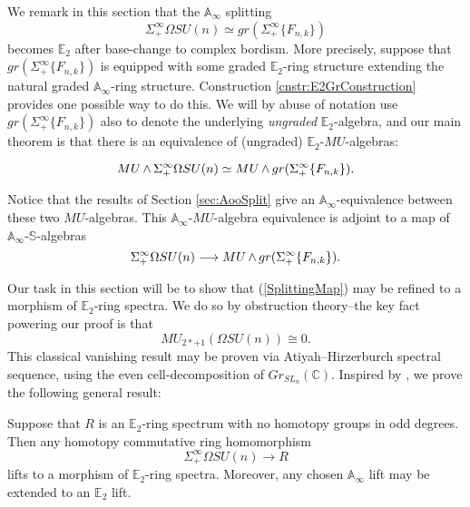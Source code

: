 
We remark in this section that the $\mathbb{A}_\infty$ splitting $$\Sigma^{\infty}_+ \Omega SU(n) \simeq gr(\Sigma^{\infty}_+ \{F_{n,k}\})$$ becomes $\mathbb{E}_2$ after base-change to complex bordism.  More precisely, suppose that $gr(\Sigma^{\infty}_+ \{F_{n,k}\})$ is equipped with some graded $\mathbb{E}_2$-ring structure extending the natural graded $\mathbb{A}_\infty$-ring structure.  Construction \ref{cnstr:E2GrConstruction} provides one possible way to do this.  We will by abuse of notation use $gr(\Sigma^{\infty}_+ \{F_{n,k}\})$ also to denote the underlying \textit{ungraded} $\mathbb{E}_2$-algebra, and our main theorem is that there is an equivalence of (ungraded) $\mathbb{E}_2$-$MU$-algebras:

$$MU \operatorname{\wedge} \Sigma^{\infty}_+ \Omega SU(n) \simeq MU \operatorname{\wedge} gr(\Sigma^{\infty}_+ \{F_{n,k}\}).$$

Notice that the results of Section \ref{sec:AooSplit} give an $\mathbb{A}_\infty$-equivalence between these two $MU$-algebras.  This $\mathbb{A}_\infty$-$MU$-algebra equivalence is adjoint to a map of $\mathbb{A}_\infty$-$\mathbb{S}$-algebras
\begin{equation} \label{SplittingMap}
\Sigma_+^{\infty} \Omega SU(n) \longrightarrow MU \operatorname{\wedge} gr(\Sigma^{\infty}_+ \{F_{n,k}\}).
\end{equation}

Our task in this section will be to show that (\ref{SplittingMap}) may be refined to a morphism of $\mathbb{E}_2$-ring spectra.  We do so by obstruction theory--the key fact powering our proof is that 
$$MU_{2*+1}\left(\Omega SU(n)\right) \cong 0.$$
This classical vanishing result may be proven via Atiyah--Hirzerburch spectral sequence, using the even cell-decomposition of $Gr_{SL_n}(\mathbb{C})$.  Inspired by \cite{ChadwickMandell}, we prove the following general result:

\begin{thm}
Suppose that $R$ is an $\mathbb{E}_2$-ring spectrum with no homotopy groups in odd degrees.  Then any homotopy commutative ring homomorphism
$$\Sigma^{\infty}_+ \Omega SU(n) \rightarrow R$$
lifts to a morphism of $\mathbb{E}_2$-ring spectra.  Moreover, any chosen $\mathbb{A}_\infty$ lift may be extended to an $\mathbb{E}_2$ lift.
\end{thm}

